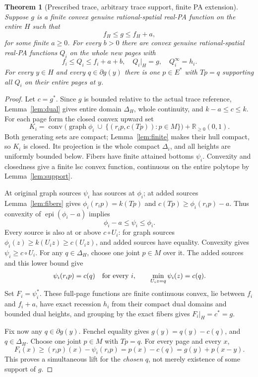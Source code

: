 \documentclass[11pt]{article}
\newtheorem{theorem}{Theorem}[section]
\newcommand{\R}{\mathbb R}
\newcommand{\epi}{\operatorname{epi}}
\newcommand{\conv}{\operatorname{conv}}
\begin{document}
\begin{theorem}[Prescribed trace, arbitrary trace support, finite PA extension]\label{thm:trace}
Suppose $g$ is a finite convex genuine rational-spatial real-PA function on the entire $H$ such that
\[
f_H\leq g\leq f_H+a,
\]
for some finite $a\geq0$. For every $b>0$ there are convex genuine rational-spatial real-PA functions $Q_i$ on the whole new pages with
\[
f_i\leq Q_i\leq f_i+a+b,
\quad Q_i|_H=g,
\quad Q_i^\infty=h_i.
\]
For every $y\in H$ and \emph{every} $q\in\partial g(y)$ there is one $p\in E^*$ with $Tp=q$ supporting all $Q_i$ on their entire pages at $y$.
\end{theorem}
\begin{proof}
Let $c=g^*$. Since $g$ is bounded relative to the actual trace reference, Lemma~\ref{lem:dual} gives entire domain $\Delta_H$, whole continuity, and $k-a\leq c\leq k$. For each page form the closed convex upward set
\[
K_i=\conv\bigl(\operatorname{graph}\phi_i\ \cup\
\{(r_i p,c(Tp)):p\in M\}\bigr)+\R_{\geq0}(0,1).
\]
Both generating sets are compact; Lemma~\ref{lem:finite} makes their hull compact, so $K_i$ is closed. Its projection is the whole compact $\Delta_i$, and all heights are uniformly bounded below. Fibers have finite attained bottoms $\psi_i$. Convexity and closedness give a finite lsc convex function, continuous on the entire polytope by Lemma~\ref{lem:support}.

At original graph sources $\psi_i$ has sources at $\phi_i$; at added sources Lemma~\ref{lem:fibers} gives $\phi_i(r_i p)=k(Tp)$ and $c(Tp)\geq\phi_i(r_i p)-a$. Thus convexity of $\epi(\phi_i-a)$ implies
\[
\phi_i-a\leq\psi_i\leq\phi_i.
\]
Every source is also at or above $c\circ U_i$: for graph sources $\phi_i(z)\geq k(U_i z)\geq c(U_i z)$, and added sources have equality. Convexity gives $\psi_i\geq c\circ U_i$. For any $q\in\Delta_H$, choose one joint $p\in M$ over it. The added sources and this lower bound give
\[
\psi_i(r_i p)=c(q)\quad\hbox{for every }i,
\qquad \min_{U_i z=q}\psi_i(z)=c(q).
\]
Set $F_i=\psi_i^*$. These full-page functions are finite continuous convex, lie between $f_i$ and $f_i+a$, have exact recession $h_i$ from their compact dual domains and bounded dual heights, and grouping by the exact fibers gives $F_i|_H=c^*=g$.

Fix now any $q\in\partial g(y)$. Fenchel equality gives $g(y)=q(y)-c(q)$, and $q\in\Delta_H$. Choose one joint $p\in M$ with $Tp=q$. For every page and every $x$,
\[
F_i(x)\geq(r_i p)(x)-\psi_i(r_i p)
=p(x)-c(q)=g(y)+p(x-y).
\]
This proves a simultaneous lift for the \emph{chosen} $q$, not merely existence of some support of $g$.


\end{proof}
\end{document}
